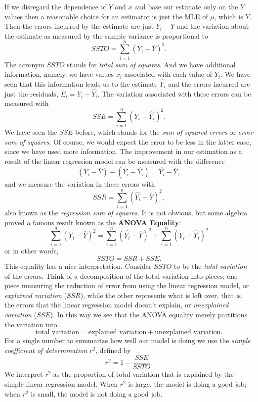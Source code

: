 \documentclass[captions=tableheading]{scrbook}
\begin{document}
If we disregard the dependence of \(Y\) and \(x\) and base our estimate only on the \(Y\) values then a reasonable choice for an estimator is just the MLE of \(\mu\), which is \(\overline{Y}\). Then the errors incurred by the estimate are just \(Y_{i}-\overline{Y}\) and the variation about the estimate as measured by the sample variance is proportional to
\begin{equation}
SSTO=\sum_{i=1}^{n}(Y_{i}-\overline{Y})^{2}.
\end{equation}
The acronym \(SSTO\) stands for \emph{total sum of squares}.  And we have additional information, namely, we have values \(x_{i}\) associated with each value of \(Y_{i}\). We have seen that this information leads us to the estimate \(\hat{Y_{i}}\) and the errors incurred are just the residuals, \(E_{i}=Y_{i}-\hat{Y_{i}}\). The variation associated with these errors can be measured with 
\begin{equation}
SSE=\sum_{i=1}^{n}(Y_{i}-\hat{Y_{i}})^{2}.
\end{equation}
We have seen the \(SSE\) before, which stands for the \emph{sum of squared errors} or \emph{error sum of squares}. Of course, we would expect the error to be less in the latter case, since we have used more information. The improvement in our estimation as a result of the linear regression model can be measured with the difference
\[
(Y_{i}-\overline{Y})-(Y_{i}-\hat{Y_{i}})=\hat{Y_{i}}-\overline{Y},
\]
and we measure the variation in these errors with
\begin{equation}
SSR=\sum_{i=1}^{n}(\hat{Y_{i}}-\overline{Y})^{2},
\end{equation}
also known as the \emph{regression sum of squares}. It is not obvious, but some algebra proved a famous result known as the \textbf{ANOVA Equality}:
\begin{equation}
\sum_{i=1}^{n}(Y_{i}-\overline{Y})^{2}=\sum_{i=1}^{n}(\hat{Y_{i}}-\overline{Y})^{2}+\sum_{i=1}^{n}(Y_{i}-\hat{Y_{i}})^{2}\label{eq:anovaeq}
\end{equation}
or in other words,
\begin{equation}
SSTO=SSR+SSE.
\end{equation}
This equality has a nice interpretation. Consider \(SSTO\) to be the \emph{total variation} of the errors. Think of a decomposition of the total variation into pieces: one piece measuring the reduction of error from using the linear regression model, or \emph{explained variation} (\(SSR\)), while the other represents what is left over, that is, the errors that the linear regression model doesn't explain, or \emph{unexplained variation} (\(SSE\)). In this way we see that the ANOVA equality merely partitions the variation into 
\[
\mbox{total variation}=\mbox{explained variation}+\mbox{unexplained variation}.
\]
For a single number to summarize how well our model is doing we use the \emph{simple coefficient of determination} \(r^{2}\), defined by
\begin{equation}
r^{2}=1-\frac{SSE}{SSTO}.
\end{equation}
We interpret \(r^{2}\) as the proportion of total variation that is explained by the simple linear regression model. When \(r^{2}\) is large, the model is doing a good job; when \(r^{2}\) is small, the model is not doing a good job.
\end{document}
